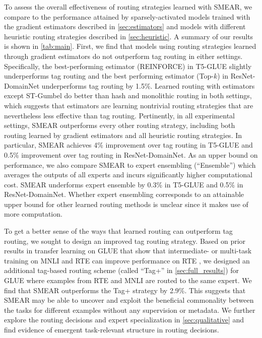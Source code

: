 \documentclass{article}
\theoremstyle{plain}
\theoremstyle{definition}
\theoremstyle{remark}
\begin{document}
To assess the overall effectiveness of routing strategies learned with SMEAR, we compare to the performance attained by sparsely-activated models trained with the gradient estimators described in \cref{sec:estimators} and models with different heuristic routing strategies described in \cref{sec:heuristic}.
A summary of our results is shown in \cref{tab:main}.
First, we find that models using routing strategies learned through gradient estimators do not outperform tag routing in either settings. 
Specifically, the best-performing estimator (REINFORCE) in T5-GLUE slightly underperforms tag routing and the best performing estimator (Top-$k$) in ResNet-DomainNet underperforms tag routing by 1.5\%.
Learned routing with estimators except ST-Gumbel do better than hash and monolithic routing in both settings, which suggests that estimators are learning nontrivial routing strategies that are nevertheless less effective than tag routing. 
Pertinently, in all experimental settings, SMEAR outperforms every other routing strategy, including both routing learned by gradient estimators and all heuristic routing strategies.
In particular, SMEAR achieves 4\% improvement over tag routing in T5-GLUE and 0.5\% improvement over tag routing in ResNet-DomainNet.
As an upper bound on performance, we also compare SMEAR to expert ensembling (``Ensemble'') which averages the outputs of all experts and incurs significantly higher computational cost. 
SMEAR underforms expert ensemble by 0.3\% in T5-GLUE and 0.5\% in ResNet-DomainNet.
Whether expert ensembling corresponds to an attainable upper bound for other learned routing methods is unclear since it makes use of more computation.

To get a better sense of the ways that learned routing can outperform tag routing, we sought to design an improved tag routing strategy.
Based on prior results in transfer learning on GLUE that show that intermediate- or multi-task training on MNLI and RTE can improve performance on RTE \citep{phang2018sentence, devlin2018bert, pruksachatkun2020intermediate, vu2020exploring}, we designed an additional tag-based routing scheme (called ``Tag+'' in \cref{sec:full_results}) for GLUE where examples from RTE and MNLI are routed to the same expert.
We find that SMEAR outperforms the Tag+ strategy by 2.9\%. 
This suggests that SMEAR may be able to uncover and exploit the beneficial commonality between the tasks for different examples without any supervision or metadata.
We further explore the routing decisions and expert specialization in \cref{sec:qualitative} and find evidence of emergent task-relevant structure in routing decisions.
\end{document}
